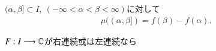 	\begin{screen}
		\begin{thm}[左半開区間のStiletjes測度]
			$(\alpha,\beta] \subset I,\ (-\infty < \alpha < \beta < \infty)$に対して
			\begin{align}
				\mu((\alpha,\beta]) = f(\beta) - f(\alpha).
			\end{align}
		\end{thm}
	\end{screen}
	
	\begin{screen}
		\begin{thm}
			$F:I \longrightarrow \mathbb{C}$が右連続或は左連続なら
		\end{thm}
	\end{screen}
	
	\begin{screen}
		\begin{thm}[時間変更]
			
		\end{thm}
	\end{screen}